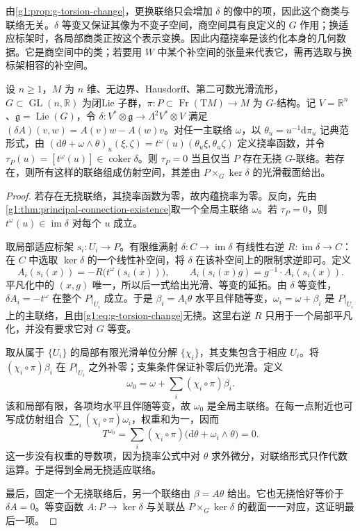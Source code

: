 由\cref{g1:prop:g-torsion-change}，更换联络只会增加 \(\delta\) 的像中的项，因此这个商类与联络无关。\(\delta\) 等变又保证其像为不变子空间，商空间具有良定义的 \(G\) 作用；换适应标架时，各局部商类正按这个表示变换。因此内蕴挠率是该约化本身的几何数据。它是商空间中的类；若要用 \(W\) 中某个补空间的张量来代表它，需再选取与换标架相容的补空间。

\begin{theorem}
	\label{g1:thm:intrinsic-torsion-zero}
	设 \(n\ge1\)，\(M\) 为 \(n\) 维、无边界、Hausdorff、第二可数光滑流形，\(G\subset\operatorname{GL}(n,\mathbb R)\) 为闭Lie 子群，\(\pi:P\subset\operatorname{Fr}(\mathrm{T}M)\to M\) 为 \(G\)-结构。记 \(V=\mathbb R^n\)、\(\mathfrak g=\operatorname{Lie}(G)\)，令 \(\delta:V^*\otimes\mathfrak g\to\Lambda^2V^*\otimes V\) 满足 \((\delta A)(v,w)=A(v)w-A(w)v\)。对任一主联络 \(\omega\)，以 \(\theta_u=u^{-1}\mathrm d\pi_u\) 记典范形式，由 \((\mathrm d\theta+\omega\wedge\theta)_u(\xi,\zeta)=t^\omega(u)(\theta_u\xi,\theta_u\zeta)\) 定义挠率函数，并令 \(\tau_P(u)=[t^\omega(u)]\in\operatorname{coker}\delta\)。则 \(\tau_P=0\) 当且仅当 \(P\) 存在无挠 \(G\)-联络。若存在，则所有这样的联络组成仿射空间，其差由 \(P\times_G\ker\delta\) 的光滑截面给出。
\end{theorem}
\begin{proof}
	若存在无挠联络，其挠率函数为零，故内蕴挠率为零。反向，先由\cref{g1:thm:principal-connection-existence}取一个全局主联络 \(\omega\)。若 \(\tau_P=0\)，则 \(t^\omega(u)\in\operatorname{im}\delta\) 对每个 \(u\) 成立。

	取局部适应标架 \(s_i:U_i\to P\)。有限维满射 \(\delta:C\to\operatorname{im}\delta\) 有线性右逆 \(R:\operatorname{im}\delta\to C\)：在 \(C\) 中选取 \(\ker\delta\) 的一个线性补空间，将 \(\delta\) 在该补空间上的限制求逆即可。定义
	\[
		A_i(s_i(x))=-R\bigl(t^\omega(s_i(x))\bigr),
		\qquad
		A_i(s_i(x)g)=g^{-1}\cdot A_i(s_i(x)).
	\]
	平凡化中的 \((x,g)\) 唯一，所以后一式给出光滑、等变的延拓。由 \(\delta\) 等变性，\(\delta A_i=-t^\omega\) 在整个 \(P|_{U_i}\) 成立。于是 \(\beta_i=A_i\theta\) 水平且伴随等变，\(\omega_i=\omega+\beta_i\) 是 \(P|_{U_i}\) 上的主联络，且由\eqref{g1:eq:g-torsion-change}无挠。这里右逆 \(R\) 只用于一个局部平凡化，并没有要求它对 \(G\) 等变。

	取从属于 \(\{U_i\}\) 的局部有限光滑单位分解 \(\{\chi_i\}\)，其支集包含于相应 \(U_i\)。将 \((\chi_i\circ\pi)\beta_i\) 在 \(P|_{U_i}\) 之外补零；支集条件保证补零后仍光滑。定义
	\[
		\omega_0=\omega+\sum_i(\chi_i\circ\pi)\beta_i.
	\]
	该和局部有限，各项均水平且伴随等变，故 \(\omega_0\) 是全局主联络。在每一点附近也可写成仿射组合 \(\sum_i(\chi_i\circ\pi)\omega_i\)，权重和为一，因而
	\[
		T^{\omega_0}
		=\sum_i(\chi_i\circ\pi)
		\bigl(\mathrm{d}\theta+\omega_i\wedge\theta\bigr)=0.
	\]
	这一步没有权重的导数项，因为挠率公式中对 \(\theta\) 求外微分，对联络形式只作代数运算。于是得到全局无挠适应联络。

	最后，固定一个无挠联络后，另一个联络由 \(\beta=A\theta\) 给出。它也无挠恰好等价于 \(\delta A=0\)。等变函数 \(A:P\to\ker\delta\) 与关联丛 \(P\times_G\ker\delta\) 的截面一一对应，这证明最后一项。
\end{proof}

